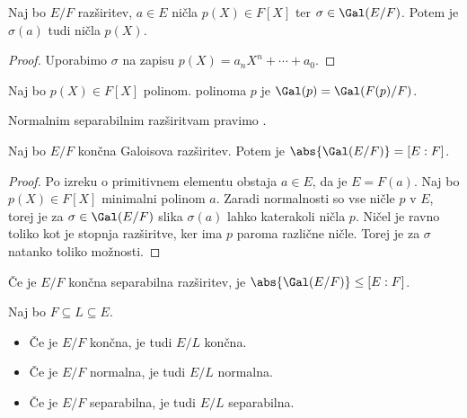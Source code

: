 \begin{lema}
  Naj bo $E/F$ razširitev, $a \in E$ ničla $p(X) \in F[X]$ ter $\sigma \in
  \Gal(E/F)$.
  Potem je $\sigma(a)$ tudi ničla $p(X)$.
\end{lema}

\begin{proof}
  Uporabimo $\sigma$ na zapisu $p(X) = a_n X^n + \cdots + a_0$.
\end{proof}

\begin{definicija}
  Naj bo $p(X) \in F[X]$ polinom.
   polinoma $p$ je $\Gal(p) = \Gal(F(p)/F)$.
\end{definicija}


\begin{definicija}
  Normalnim separabilnim razširitvam pravimo .
\end{definicija}

\begin{trditev}
  Naj bo $E/F$ končna Galoisova razširitev.
  Potem je $\abs{\Gal(E/F)} = [E:F]$.
\end{trditev}

\begin{proof}
  Po izreku o primitivnem elementu obstaja $a \in E$, da je $E = F(a)$.
  Naj bo $p(X) \in F[X]$ minimalni polinom $a$.
  Zaradi normalnosti so vse ničle $p$ v $E$, torej je za $\sigma \in \Gal(E/F)$
  slika $\sigma(a)$ lahko katerakoli ničla $p$.
  Ničel je ravno toliko kot je stopnja razširitve, ker ima $p$ paroma različne
  ničle.
  Torej je za $\sigma$ natanko toliko možnosti.
\end{proof}

\begin{opomba}
  Če je $E/F$ končna separabilna razširitev, je $\abs{\Gal(E/F)} \le [E:F]$.
\end{opomba}


\begin{lema}
  Naj bo $F \subseteq L \subseteq E$.
  \begin{itemize}
  \item Če je $E/F$ končna, je tudi $E/L$ končna.
  \item Če je $E/F$ normalna, je tudi $E/L$ normalna.
  \item Če je $E/F$ separabilna, je tudi $E/L$ separabilna.
  \end{itemize}
\end{lema}

